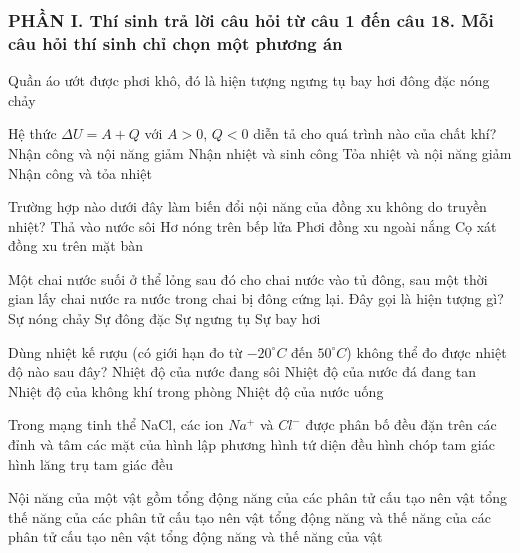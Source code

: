 \subsubsection*{PHẦN I. Thí sinh trả lời câu hỏi từ câu 1 đến câu 18. Mỗi câu hỏi thí sinh chỉ chọn một phương án}
\setcounter{ex}{0}
\begin{ex} %
	Quần áo ướt được phơi khô, đó là hiện tượng
	\choice
	{ngưng tụ}
	{\True bay hơi}
	{đông đặc}
	{nóng chảy}
	\loigiai{}
\end{ex}

\begin{ex} %
	Hệ thức $\Delta U = A + Q$ với $A > 0$, $Q < 0$ diễn tả cho quá trình nào của chất khí?
	\choice
	{Nhận công và nội năng giảm}
	{Nhận nhiệt và sinh công}
	{Tỏa nhiệt và nội năng giảm}
	{\True Nhận công và tỏa nhiệt}
	\loigiai{}
\end{ex}

\begin{ex} %
	Trường hợp nào dưới đây làm biến đổi nội năng của đồng xu không do truyền nhiệt?
	\choice
	{Thả vào nước sôi}
	{Hơ nóng trên bếp lửa}
	{Phơi đồng xu ngoài nắng}
	{\True Cọ xát đồng xu trên mặt bàn}
	\loigiai{}
\end{ex}

\begin{ex} %
	Một chai nước suối ở thể lỏng sau đó cho chai nước vào tủ đông, sau một thời gian lấy chai nước ra nước trong chai bị đông cứng lại. Đây gọi là hiện tượng gì?
	\choice
	{Sự nóng chảy}
	{\True Sự đông đặc}
	{Sự ngưng tụ}
	{Sự bay hơi}
	\loigiai{}
\end{ex}

\begin{ex} %
	Dùng nhiệt kế rượu (có giới hạn đo từ $-20^\circ C$ đến $50^\circ C$) không thể đo được nhiệt độ nào sau đây?
	\choice
	{\True Nhiệt độ của nước đang sôi}
	{Nhiệt độ của nước đá đang tan}
	{Nhiệt độ của không khí trong phòng}
	{Nhiệt độ của nước uống}
	\loigiai{}
\end{ex}

\begin{ex} %
	Trong mạng tinh thể NaCl, các ion $Na^+$ và $Cl^-$ được phân bố đều đặn trên các đỉnh và tâm các mặt của
	\choice
	{\True hình lập phương}
	{hình tứ diện đều}
	{hình chóp tam giác}
	{hình lăng trụ tam giác đều}
	\loigiai{}
\end{ex}

\begin{ex} %
	Nội năng của một vật gồm
	\choice
	{tổng động năng của các phân tử cấu tạo nên vật}
	{tổng thế năng của các phân tử cấu tạo nên vật}
	{\True tổng động năng và thế năng của các phân tử cấu tạo nên vật}
	{tổng động năng và thế năng của vật}
	\loigiai{}
\end{ex}

